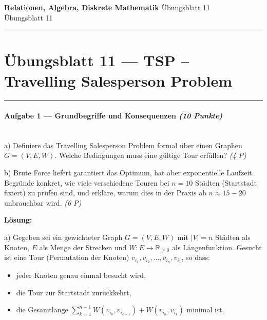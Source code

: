 \documentclass[11pt, a4paper]{article}
\providecommand{\nichttitle}{Übungsblatt}
\providecommand{\nichtsubtitle}{}
\renewcommand{\nichttitle}{Relationen, Algebra, Diskrete Mathematik}
\renewcommand{\nichtsubtitle}{Übungsblatt 11}
\begin{document}
\begin{center}
{\Large\bfseries\color{accent}\nichttitle}
\ifx\nichtsubtitle\empty\else
  \\[2pt]{\normalsize\color{accent!80!black}\nichtsubtitle}
\fi
\\[2pt]
\color{accent}\rule{0.4\linewidth}{0.8pt}\color{black}
\end{center}
\vspace{4pt}


\section{Übungsblatt 11 — TSP – Travelling Salesperson Problem}


\noindent\textcolor{rulegray}{\rule{\linewidth}{0.4pt}}


\paragraph{Aufgabe 1 — Grundbegriffe und Konsequenzen \textit{(10 Punkte)}}\mbox{}\\[2pt]

a) Definiere das Travelling Salesperson Problem formal über einen Graphen $G=(V,E,W)$. Welche Bedingungen muss eine gültige Tour erfüllen? \textit{(4 P)}


b) Brute Force liefert garantiert das Optimum, hat aber exponentielle Laufzeit. Begründe konkret, wie viele verschiedene Touren bei $n=10$ Städten (Startstadt fixiert) zu prüfen sind, und erkläre, warum dies in der Praxis ab $n\approx 15{-}20$ unbrauchbar wird. \textit{(6 P)}


\textbf{Lösung:}


a) Gegeben sei ein gewichteter Graph $G=(V,E,W)$ mit $|V|=n$ Städten als Knoten, $E$ als Menge der Strecken und $W:E\to\mathbb{R}_{\geq 0}$ als Längenfunktion. Gesucht ist eine Tour (Permutation der Knoten) $v_{i_1},v_{i_2},\dots,v_{i_n},v_{i_1}$, so dass:

\begin{itemize}
  \item jeder Knoten genau einmal besucht wird,
  \item die Tour zur Startstadt zurückkehrt,
  \item die Gesamtlänge $\sum_{k=1}^{n-1} W(v_{i_k},v_{i_{k+1}}) + W(v_{i_n},v_{i_1})$ minimal ist.
\end{itemize}
\end{document}
